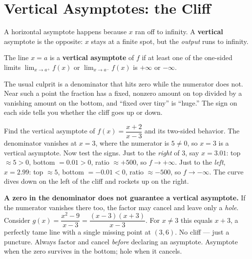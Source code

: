 \section{Vertical Asymptotes: the Cliff}
\label{ch09:vertical}

A horizontal asymptote happens because $x$ ran off to infinity. A
\textbf{vertical} asymptote is the opposite: $x$ stays at a finite spot, but the
\emph{output} runs to infinity.

\begin{definition}
\label{ch09:def-va}
The line $x=a$ is a \textbf{vertical asymptote} of $f$ if at least one of the
one-sided limits $\lim_{x\to a^+} f(x)$ or $\lim_{x\to a^-} f(x)$ is $+\infty$
or $-\infty$.
\end{definition}

The usual culprit is a denominator that hits zero while the numerator does not.
Near such a point the fraction has a fixed, nonzero amount on top divided by a
vanishing amount on the bottom, and ``fixed over tiny'' is ``huge.'' The sign on
each side tells you whether the cliff goes up or down.

\begin{labbox}
Find the vertical asymptote of $f(x)=\dfrac{x+2}{x-3}$ and its two-sided
behavior. The denominator vanishes at $x=3$, where the numerator is $5\ne 0$, so
$x=3$ is a vertical asymptote. Now test the signs. Just to the \emph{right} of
$3$, say $x=3.01$: top $\approx 5>0$, bottom $=0.01>0$, ratio $\approx +500$, so
$f\to+\infty$. Just to the \emph{left}, $x=2.99$: top $\approx 5$, bottom
$=-0.01<0$, ratio $\approx -500$, so $f\to-\infty$. The curve dives down on the
left of the cliff and rockets up on the right.
\end{labbox}

\begin{trapbox}
\textbf{A zero in the denominator does not guarantee a vertical asymptote.}
If the numerator vanishes there too, the factor may cancel and leave only a
\emph{hole}. Consider $g(x)=\dfrac{x^2-9}{x-3}=\dfrac{(x-3)(x+3)}{x-3}$. For
$x\ne 3$ this equals $x+3$, a perfectly tame line with a single missing point at
$(3,6)$. No cliff --- just a puncture. Always factor and cancel \emph{before}
declaring an asymptote. Asymptote when the zero survives in the bottom; hole
when it cancels.
\end{trapbox}

